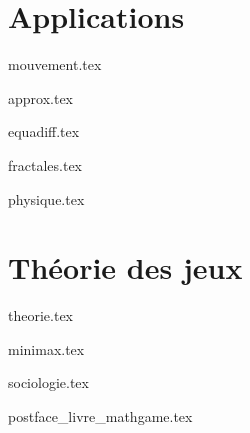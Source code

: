 \documentclass[10pt,twoside,openright]{report}
\begin{document}
\part{Applications}

{mouvement.tex}

{approx.tex}

{equadiff.tex}

{fractales.tex}

{physique.tex}



\part{Théorie des jeux}

{theorie.tex}

{minimax.tex}

{sociologie.tex}


\clearemptydoublepage

{postface_livre_mathgame.tex}


~\vfill
\bigskip

\end{document}
